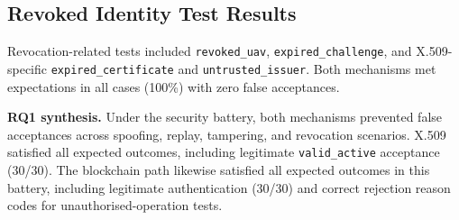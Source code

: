 \subsection{Revoked Identity Test Results}
\label{sec:ch5-revoked}

Revocation-related tests included \texttt{revoked\_uav}, \texttt{expired\_challenge}, and X.509-specific \texttt{expired\_certificate} and \texttt{untrusted\_issuer}. Both mechanisms met expectations in all cases (100\%) with zero false acceptances.

\textbf{RQ1 synthesis.} Under the security battery, both mechanisms prevented false acceptances across spoofing, replay, tampering, and revocation scenarios. X.509 satisfied all expected outcomes, including legitimate \texttt{valid\_active} acceptance (30/30). The blockchain path likewise satisfied all expected outcomes in this battery, including legitimate authentication (30/30) and correct rejection reason codes for unauthorised-operation tests.
